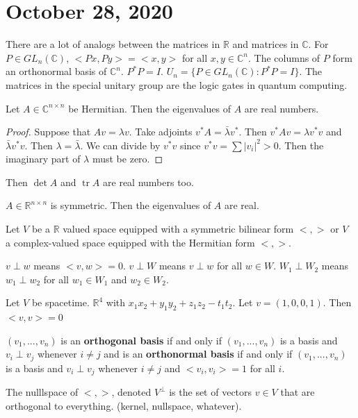 \documentclass{article}
\newcommand{\vocab}[1]{\textbf{\color{blue!90}\boldmath #1}}
\newcommand{\C}{\mathbb{C}}
\newcommand{\R}{\mathbb{R}}
\DeclareMathOperator{\tr}{tr}
\begin{document}
\section{October 28, 2020}
There are a lot of analogs between the matrices in $\R$ and matrices in $\C$. For $P\in GL_n(\C)$, $<Px,Py>=<x,y>$ for all $x,y\in\C^n$. The columns of $P$ form an orthonormal basis of $\C^n$. $P^*P=I$. $U_n=\{P\in GL_n(\C):P^*P=I\}$.
The matrices in the special unitary group are the logic gates in quantum computing.
\begin{theorem}
Let $A\in \C^{n\times n}$ be Hermitian. Then the eigenvalues of $A$ are real numbers.
\end{theorem}
\begin{proof}
Suppose that $Av=\lambda v$. Take adjoints $v^*A=\bar{\lambda}v^*$. Then $v^*Av=\lambda v^*v$ and $\bar{\lambda}v^*v$. Then $\lambda=\bar{\lambda}$. We can divide by $v^*v$ since $v^*v=\sum|v_i|^2>0$. Then the imaginary part of $\lambda$ must be zero.
\end{proof}
\begin{corollary}
Then $\det A$ and $\tr A$ are real numbers too.
\end{corollary}
\begin{corollary}
$A\in \R^{n\times n}$ is symmetric. Then the eigenvalues of $A$ are real.
\end{corollary}
Let $V$ be a $\R$ valued space equipped with a symmetric bilinear form $<,>$ or $V$ a complex-valued space equipped with the Hermitian form $<,>$.
\begin{definition}
$v\perp w$ means $<v,w>=0$. $v \perp W$ means $v\perp w$ for all $w\in W$. $W_1\perp W_2$ means $w_1\perp w_2$ for all $w_1\in W_1$ and $w_2\in W_2$.
\end{definition}
\begin{example}
Let $V$ be spacetime. $\R^4$ with $x_1x_2+y_1y_2+z_1z_2-t_1t_2$. Let $v=(1,0,0,1)$. Then $<v,v>=0$
\end{example}
\begin{definition}
$(v_1,...,v_n)$ is an \vocab{orthogonal basis} if and only if $(v_1,...,v_n)$ is a basis and $v_i\perp v_j$ whenever $i\neq j$ and is an \vocab{orthonormal basis} if and only if $(v_1,...,v_n)$ is a basis and $v_i\perp v_j$ whenever $i\neq j$ and $<v_i,v_i>=1$ for all $i$.
\end{definition}
\begin{definition}
The nulllspace of $<,>$, denoted $V^\perp$ is the set of vectors $v\in V$ that are orthogonal to everything. (kernel, nullspace, whatever).
\end{definition}
\end{document}
